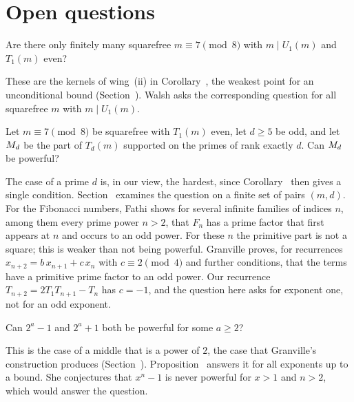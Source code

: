\section{Open questions}

\begin{question}
Are there only finitely many squarefree $m \equiv 7 \pmod 8$ with $m \mid U_1(m)$ and $T_1(m)$ even?
\end{question}

These are the kernels of wing~(ii) in Corollary~, the weakest point for an unconditional bound
(Section~). Walsh \cite[p.~97]{Walsh1988} asks the corresponding question for all squarefree $m$ with $m \mid U_1(m)$.

\begin{question}
Let $m \equiv 7 \pmod 8$ be squarefree with $T_1(m)$ even, let $d \ge 5$ be odd, and let $M_{d}$ be the part of $T_d(m)$ supported on the primes of rank exactly $d$. Can $M_{d}$ be powerful?
\end{question}

The case of a prime $d$ is, in our view, the hardest, since Corollary~ then gives a single condition. Section~ examines
the question on a finite set of pairs $(m, d)$. For the Fibonacci numbers, Fathi \cite[Theorems~1.2--1.6]{Fathi2026} shows for several infinite families of
indices $n$, among them every prime power $n > 2$, that $F_n$ has a prime factor that first appears at $n$ and occurs to an odd power. For
these $n$ the primitive part is not a square; this is weaker than not being powerful. Granville \cite[Theorem~3]{Granville2012}
proves, for recurrences $x_{n+2} = b\,x_{n+1} + c\,x_n$ with $c \equiv 2 \pmod 4$ and further conditions, that the terms have a primitive
prime factor to an odd power. Our recurrence $T_{n+2} = 2T_1 T_{n+1} - T_n$ has $c = -1$, and the question here asks for exponent one, not
for an odd exponent.

\begin{question}
Can $2^a - 1$ and $2^a + 1$ both be powerful for some $a \ge 2$?
\end{question}

This is the case of a middle that is a power of $2$, the case that Granville's construction produces (Section~).
Proposition~ answers it for all exponents up to a bound. She \cite[p.~7]{She2025} conjectures that $x^n - 1$ is never powerful
for $x > 1$ and $n > 2$, which would answer the question.

